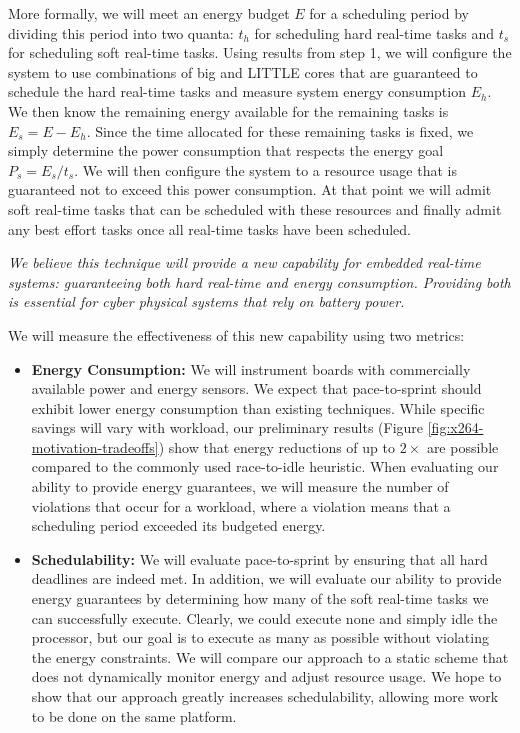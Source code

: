 More formally, we will meet an energy budget $E$ for a scheduling
period by dividing this period into two quanta: $t_h$ for scheduling
hard real-time tasks and $t_s$ for scheduling soft real-time tasks.
Using results from step 1, we will configure the system to use
combinations of big and LITTLE cores that are guaranteed to schedule
the hard real-time tasks and measure system energy consumption $E_h$.
We then know the remaining energy available for the remaining tasks is
$E_s = E - E_h$.  Since the time allocated for these remaining tasks
is fixed, we simply determine the power consumption that respects the
energy goal $P_s = E_s/t_s$.  We will then configure the system to a
resource usage that is guaranteed not to exceed this power
consumption.  At that point we will admit soft real-time tasks that
can be scheduled with these resources and finally admit any best
effort tasks once all real-time tasks have been scheduled.

\emph{We believe this technique will provide a new capability for
  embedded real-time systems: guaranteeing both hard real-time and
  energy consumption. Providing both is essential for cyber physical
  systems that rely on battery power.}

We will measure the effectiveness of this new capability using two
metrics:
\begin{itemize}
\item \textbf{Energy Consumption:} We will instrument boards with
  commercially available power and energy sensors.  We expect that
  pace-to-sprint should exhibit lower energy consumption than existing
  techniques.  While specific savings will vary with workload, our
  preliminary results (Figure \ref{fig:x264-motivation-tradeoffs}) show that energy
  reductions of up to $2 \times$ are possible compared to the commonly
  used race-to-idle heuristic.  When evaluating our ability to provide
  energy guarantees, we will measure the number of violations that
  occur for a workload, where a violation means that a scheduling
  period exceeded its budgeted energy.
\item \textbf{Schedulability:} We will evaluate pace-to-sprint by
  ensuring that all hard deadlines are indeed met.  In addition, we
  will evaluate our ability to provide energy guarantees by
  determining how many of the soft real-time tasks we can successfully
  execute.  Clearly, we could execute none and simply idle the
  processor, but our goal is to execute as many as possible without
  violating the energy constraints.  We will compare our approach to a
  static scheme that does not dynamically monitor energy and adjust
  resource usage.  We hope to show that our approach greatly increases
  schedulability, allowing more work to be done on the same platform.
\end{itemize}

